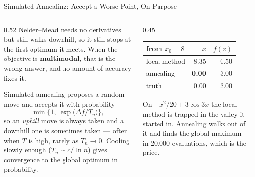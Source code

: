 \begin{frame}{Simulated Annealing: Accept a Worse Point, On Purpose}
\begin{columns}[T]
\begin{column}{0.52\textwidth}
\small
Nelder--Mead needs no derivatives but still walks downhill, so it still stops at the first optimum it meets. When the objective is \textbf{multimodal}, that is the wrong answer, and no amount of accuracy fixes it.
\medskip

Simulated annealing proposes a random move and accepts it with probability
\[
  \min\Big\{1,\ \exp\big(\Delta f/T_n\big)\Big\},
\]
so an \emph{uphill} move is always taken and a downhill one is sometimes taken --- often when $T$ is high, rarely as $T_n\to0$.
\medskip
\footnotesize
Cooling slowly enough ($T_n\sim c/\ln n$) gives convergence to the global optimum in probability.
\end{column}
\begin{column}{0.45\textwidth}
\begin{center}\footnotesize
\begin{tabularx}{\linewidth}{@{}>{\raggedright\arraybackslash}X r r@{}}
\toprule
from $x_0=8$ & $x$ & $f(x)$ \\
\midrule
local method & 8.35 & $-0.50$ \\
annealing & \textbf{0.00} & $\mathbf{3.00}$ \\
\midrule
truth & 0.00 & 3.00 \\
\bottomrule
\end{tabularx}
\end{center}
\vspace{1mm}
\begin{takeawaybox}\footnotesize
On $-x^{2}/20+3\cos 3x$ the local method is trapped in the valley it started in. Annealing walks out of it and finds the global maximum --- in 20{,}000 evaluations, which is the price.
\end{takeawaybox}
\end{column}
\end{columns}
\vspace{1mm}
\end{frame}

